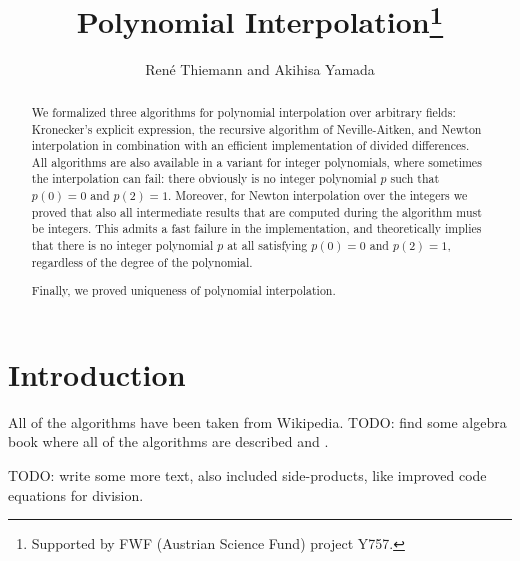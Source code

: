 \documentclass[11pt,a4paper]{article}
\begin{document}
\title{Polynomial Interpolation\footnote{Supported by FWF (Austrian Science Fund) project Y757.}}
\author{Ren\'e Thiemann and Akihisa Yamada}
\maketitle

\begin{abstract}
We formalized three algorithms for polynomial interpolation over arbitrary fields: 
Kronecker's explicit expression,
the recursive algorithm of Neville-Aitken, and Newton interpolation in combination with an
efficient implementation of divided differences. All algorithms are also available in a variant
for integer polynomials, where sometimes the interpolation can fail: there obviously is no
integer polynomial $p$ such that $p(0) = 0$ and $p(2) = 1$. Moreover, for
Newton interpolation over the integers we proved that also all intermediate 
results that are computed during the algorithm must be integers. This admits a fast failure in the 
implementation, and theoretically implies that
there is no integer polynomial $p$ at all satisfying $p(0) = 0$ and $p(2) = 1$, regardless
of the degree of the polynomial.

Finally, we proved uniqueness of polynomial interpolation.
\end{abstract}

\tableofcontents

\section{Introduction}

All of the algorithms have been taken from Wikipedia.
TODO: find some algebra book where all of the algorithms are described and \cite{it}.

TODO: write some more text, also included side-products, like improved code equations for
division.









\end{document}
